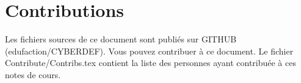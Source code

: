 
\section{Contributions}

Les fichiers sources de ce document sont publiés sur GITHUB (edufaction/CYBERDEF). Vous pouvez contribuer à ce document. Le fichier Contribute/Contribs.tex contient la liste des personnes ayant contribuée à ces notes de cours.
